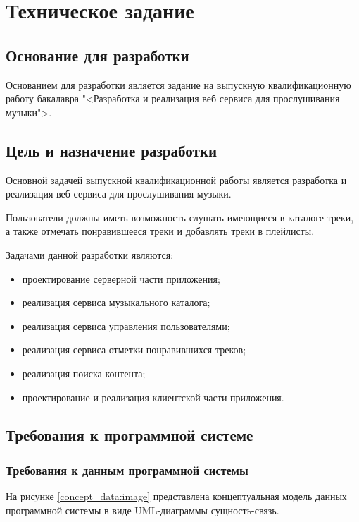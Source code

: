 \section{Техническое задание}
\subsection{Основание для разработки}

Основанием для разработки является задание на выпускную квалификационную работу бакалавра "<Разработка и реализация веб сервиса для прослушивания музыки">.

\subsection{Цель и назначение разработки}

Основной задачей выпускной квалификационной работы является разработка и реализация веб сервиса для прослушивания музыки.

Пользователи должны иметь возможность слушать имеющиеся в каталоге треки, а также отмечать понравившееся треки и добавлять треки в плейлисты.

Задачами данной разработки являются:
\begin{itemize}
\item проектирование серверной части приложения;
\item реализация сервиса музыкального каталога;
\item реализация сервиса управления пользователями;
\item реализация сервиса отметки понравившихся треков;
\item реализация поиска контента;
\item проектирование и реализация клиентской части приложения.
\end{itemize}

\subsection{Требования к программной системе}

\subsubsection{Требования к данным программной системы}

На рисунке \ref{concept_data:image} представлена концептуальная модель данных программной системы в виде UML-диаграммы сущность-связь\cite{uml}.

